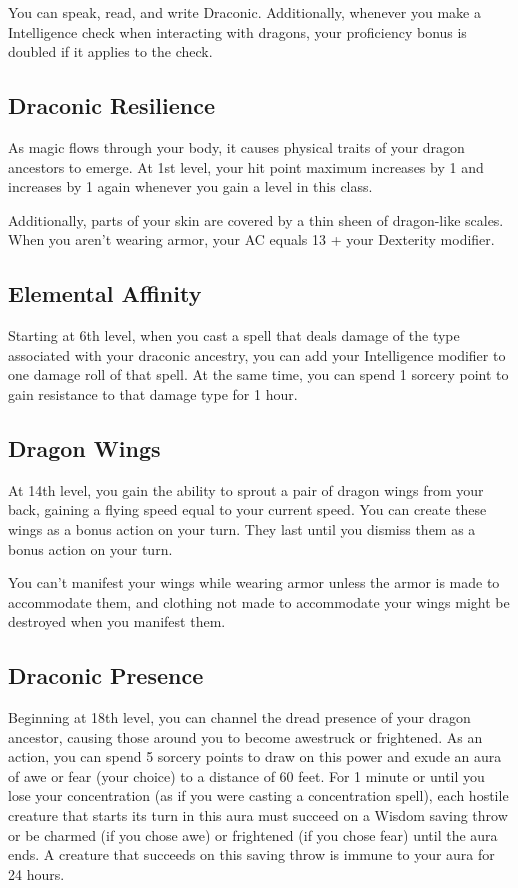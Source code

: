 You can speak, read, and write Draconic. Additionally, whenever you make a Intelligence check when interacting with dragons, your proficiency bonus is doubled if it applies to the check.

\subsection{Draconic Resilience}

As magic flows through your body, it causes physical traits of your dragon ancestors to emerge. At 1st level, your hit point maximum increases by 1 and increases by 1 again whenever you gain a level in this class.

Additionally, parts of your skin are covered by a thin sheen of dragon-like scales. When you aren't wearing armor, your AC equals 13 + your Dexterity modifier.

\subsection{Elemental Affinity}

Starting at 6th level, when you cast a spell that deals damage of the type associated with your draconic ancestry, you can add your Intelligence modifier to one damage roll of that spell. At the same time, you can spend 1 sorcery point to gain resistance to that damage type for 1 hour.

\subsection{Dragon Wings}

At 14th level, you gain the ability to sprout a pair of dragon wings from your back, gaining a flying speed equal to your current speed. You can create these wings as a bonus action on your turn. They last until you dismiss them as a bonus action on your turn.

You can't manifest your wings while wearing armor unless the armor is made to accommodate them, and clothing not made to accommodate your wings might be destroyed when you manifest them.

\subsection{Draconic Presence}

Beginning at 18th level, you can channel the dread presence of your dragon ancestor, causing those around you to become awestruck or frightened. As an action, you can spend 5 sorcery points to draw on this power and exude an aura of awe or fear (your choice) to a distance of 60 feet. For 1 minute or until you lose your concentration (as if you were casting a concentration spell), each hostile creature that starts its turn in this aura must succeed on a Wisdom saving throw or be charmed (if you chose awe) or frightened (if you chose fear) until the aura ends. A creature that succeeds on this saving throw is immune to your aura for 24 hours.